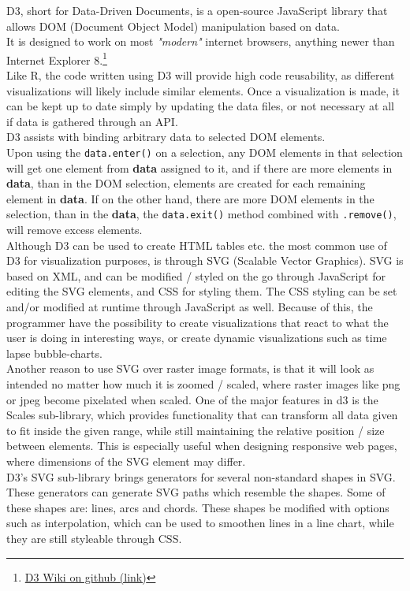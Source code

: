 \documentclass[Report.tex]{subfiles}
\begin{document}
	D3, short for Data-Driven Documents, is a open-source JavaScript library that allows DOM (Document Object Model) manipulation based on data.\\
	It is designed to work on most \textit{"modern"} internet browsers, anything newer than Internet Explorer 8.\footnote{\href{https://github.com/d3/d3/wiki\#browser--platform-support}{D3 Wiki on github (link)}}\\
	
	Like R, the code written using D3 will provide high code reusability, as different visualizations will likely include similar elements. Once a visualization is made, it can be kept up to date simply by updating the data files, or not necessary at all if data is gathered through an API.\\ 
	D3 assists with binding arbitrary data to selected DOM elements.\\ Upon using the \texttt{data.enter()} on a selection, any DOM elements in that selection will get one element from \textbf{data} assigned to it, and if there are more elements in \textbf{data}, than in the DOM selection, elements are created for each remaining element in \textbf{data}. If on the other hand, there are more DOM elements in the selection, than in the \textbf{data}, the \texttt{data.exit()} method combined with \texttt{.remove()}, will remove excess elements.\\
	Although D3 can be used to create HTML tables etc. the most common use of D3 for visualization purposes, is through SVG (Scalable Vector Graphics).
	SVG is based on XML, and can be modified / styled on the go through JavaScript for editing the SVG elements, and CSS for styling them. The CSS styling can be set and/or modified at runtime through JavaScript as well. Because of this, the programmer have the possibility to create visualizations that react to what the user is doing in interesting ways, or create dynamic visualizations such as time lapse bubble-charts.\\
	Another reason to use SVG over raster image formats, is that it will look as intended no matter how much it is zoomed / scaled, where raster images like png or jpeg become pixelated when scaled.
	One of the major features in d3 is the Scales sub-library, which provides functionality that can transform all data given to fit inside the given range, while still maintaining the relative position / size between elements.
	This is especially useful when designing responsive web pages, where dimensions of the SVG element may differ.\\
	D3's SVG sub-library brings generators for several non-standard shapes in SVG. These generators can generate SVG paths which resemble the shapes. Some of these shapes are: lines, arcs and chords. These shapes be modified with options such as interpolation, which can be used to smoothen lines in a line chart, while they are still styleable through CSS.\\
	
\end{document}
